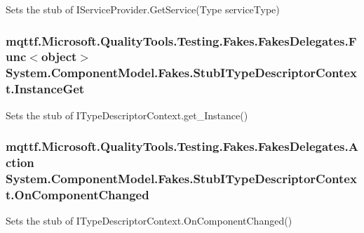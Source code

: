 Sets the stub of I\-Service\-Provider.\-Get\-Service(\-Type service\-Type)

\hypertarget{class_system_1_1_component_model_1_1_fakes_1_1_stub_i_type_descriptor_context_a31e60575ca71eafac2d1db107728afcb}{
\subsubsection[{Instance\-Get}]{\setlength{\rightskip}{0pt plus 5cm}mqttf.\-Microsoft.\-Quality\-Tools.\-Testing.\-Fakes.\-Fakes\-Delegates.\-Func$<$object$>$ System.\-Component\-Model.\-Fakes.\-Stub\-I\-Type\-Descriptor\-Context.\-Instance\-Get}}\label{class_system_1_1_component_model_1_1_fakes_1_1_stub_i_type_descriptor_context_a31e60575ca71eafac2d1db107728afcb}


Sets the stub of I\-Type\-Descriptor\-Context.\-get\-\_\-\-Instance()

\hypertarget{class_system_1_1_component_model_1_1_fakes_1_1_stub_i_type_descriptor_context_a89dba6a2919e4ef62d1ae94cfbffc824}{
\subsubsection[{On\-Component\-Changed}]{\setlength{\rightskip}{0pt plus 5cm}mqttf.\-Microsoft.\-Quality\-Tools.\-Testing.\-Fakes.\-Fakes\-Delegates.\-Action System.\-Component\-Model.\-Fakes.\-Stub\-I\-Type\-Descriptor\-Context.\-On\-Component\-Changed}}\label{class_system_1_1_component_model_1_1_fakes_1_1_stub_i_type_descriptor_context_a89dba6a2919e4ef62d1ae94cfbffc824}


Sets the stub of I\-Type\-Descriptor\-Context.\-On\-Component\-Changed()

